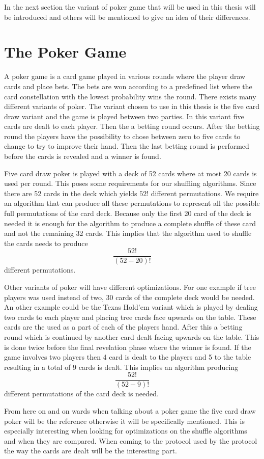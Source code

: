 \bigskip

In the next section the variant of poker game that will be used in this thesis will be introduced and others will be mentioned to give an idea of their differences.

\section{The Poker Game}
A poker game is a card game played in various rounds where the player draw cards and place bets. The bets are won according to a predefined list where the card constellation with the lowest probability wins the round. There exists many different variants of poker. The variant chosen to use in this thesis is the five card draw variant and the game is played between two parties. In this variant five cards are dealt to each player. Then the a betting round occurs. After the betting round the players have the possibility to chose between zero to five cards to change to try to improve their hand. Then the last betting round is performed before the cards is revealed and a winner is found.

Five card draw poker is played with a deck of 52 cards where at most 20 cards is used per round. This poses some requirements for our shuffling algorithms. Since there are 52 cards in the deck which yields $52!$ different permutations. We require an algorithm that can produce all these permutations to represent all the possible full permutations of the card deck. Because only the first 20 card of the deck is needed it is enough for the algorithm to produce a complete shuffle of these card and not the remaining 32 cards. This implies that the algorithm used to shuffle the cards needs to produce $$\frac{52!}{(52-20)!}$$ different permutations.

Other variants of poker will have different optimizations. For one example if tree players was used instead of two, 30 cards of the complete deck would be needed. An other example could be the Texas Hold'em variant which is played by dealing two cards to each player and placing tree cards face upwards on the table. These cards are the used as a part of each of the players hand. After this a betting round which is continued by another card dealt facing upwards on the table. This is done twice before the final revelation phase where the winner is found. If the game involves two players then 4 card is dealt to the players and 5 to the table resulting in a total of 9 cards is dealt. This implies an algorithm producing $$\frac{52!}{(52-9)!}$$ different permutations of the card deck is needed.

From here on and on wards when talking about a poker game the five card draw poker will be the reference otherwise it will be specifically mentioned. This is especially interesting when looking for optimizations on the shuffle algorithms and when they are compared. When coming to the protocol used by the protocol the way the cards are dealt will be the interesting part.